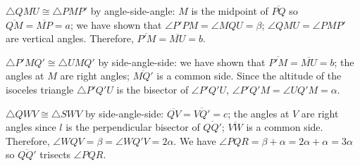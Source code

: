 $\triangle QMU\cong \triangle PMP'$ by angle-side-angle: $M$ is the midpoint of $\overline{PQ}$ so $\overline{QM}=\overline{MP}=a$; we have shown that $\angle P'PM=\angle MQU=\beta$; $\angle QMU=\angle PMP'$ are vertical angles. Therefore, $\overline{P'M}=\overline{MU}=b$.

$\triangle P'MQ'\cong \triangle UMQ'$ by side-angle-side: we have shown that $\overline{P'M}=\overline{MU}=b$; the angles at $M$ are right angles; $\overline{MQ'}$ is a common side. Since the altitude of the isoceles triangle $\triangle P'Q'U$ is the bisector of $\angle P'Q'U$, $\angle P'Q'M=\angle UQ'M=\alpha$.

$\triangle QWV\cong\triangle SWV$ by side-angle-side: $\overline{QV}=\overline{VQ'}=c$; the angles at $V$ are right angles since $l$ is the perpendicular bisector of $\overline{QQ'}$; $\overline{VW}$ is a common side. Therefore, $\angle WQV=\beta=\angle WQ'V=2\alpha$. We have $\angle PQR = \beta + \alpha = 2\alpha+\alpha=3\alpha$ so $\overline{QQ'}$ trisects $\angle PQR$.

